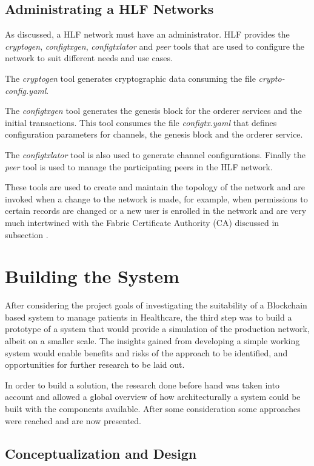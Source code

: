 \subsection{Administrating a HLF Networks}


As discussed, a HLF network must have an administrator. HLF provides the
\textit{cryptogen}, \textit{configtxgen}, \textit{configtxlator} and
\textit{peer} tools that are used to configure the network to suit different
needs and use cases.

The \textit{cryptogen} tool generates cryptographic data consuming the file
\textit{crypto-config.yaml}.

The \textit{configtxgen} tool generates the genesis block for the orderer
services and the initial transactions.  This tool consumes the file
\textit{configtx.yaml} that defines configuration parameters for channels, the
genesis block and the orderer service.

The \textit{configtxlator} tool is also used to generate channel
configurations.  Finally the \textit{peer} tool is used to manage the
participating peers in the HLF network.

These tools are used to create and maintain the topology of the network and are
invoked when a change to the network is made, for example, when permissions to
certain records are changed or a new user is enrolled in the network and are
very much intertwined with the Fabric Certificate Authority (CA) discussed in
subsection .

\section{Building the System}

After considering the project goals of investigating the suitability of a
Blockchain based system to manage patients in Healthcare, the third step was to
build a prototype of a system that would provide a simulation of the production
network, albeit on a smaller scale. The insights gained from developing a
simple working system would enable benefits and risks of the approach to be
identified, and opportunities for further research to be laid out.

In order to build a solution, the research done before hand was taken into
account and allowed a global overview of how architecturally a system could be
built with the components available. After some consideration some approaches
were reached and are now presented.

\subsection{Conceptualization and Design}


